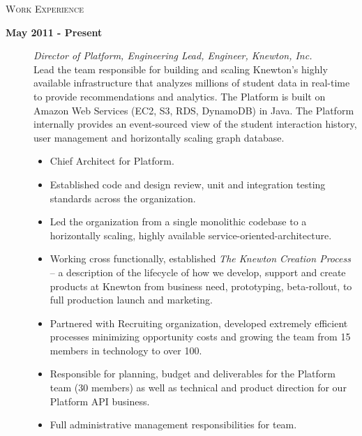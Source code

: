 \documentclass[letter]{article}
\begin{document}
\begin{description}	

 	\item \textsc{Work Experience}
	\begin{description}
		\item [\textbf{May 2011 - Present}] \emph{Director of Platform, Engineering Lead, Engineer, Knewton, Inc.}
                \\
                Lead the team responsible for building and scaling Knewton's highly available infrastructure that analyzes millions of student data in real-time to provide recommendations and analytics. The Platform is built on Amazon Web Services (EC2, S3, RDS, DynamoDB) in Java. The Platform internally provides an event-sourced view of the student interaction history, user management and horizontally scaling graph database.
			\begin{itemize}
			\item Chief Architect for Platform.
			\item Established code and design review, unit and integration testing standards across the organization.
			\item Led the organization from a single monolithic codebase to a horizontally scaling, highly available service-oriented-architecture. 
			\item Working cross functionally, established \emph{The Knewton Creation Process}  -- a description of the lifecycle of how we develop, support and create products at Knewton from business need, prototyping, beta-rollout, to full production launch and marketing.
			\item Partnered with Recruiting organization, developed extremely efficient processes minimizing opportunity costs and growing the team from 15 members in technology to over 100.
                        \item Responsible for planning, budget and deliverables for the Platform team (30 members) as well as technical and product direction for our Platform API business.
                        \item Full administrative management responsibilities for team.
			\end{itemize}


\end{description}
\end{description}
\end{document}
